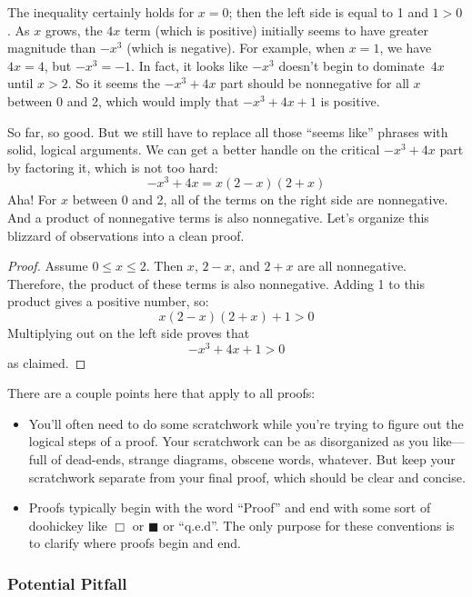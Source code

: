The inequality certainly holds for $x = 0$; then the left side is
equal to 1 and $1 > 0$.  As $x$ grows, the $4x$ term (which is
positive) initially seems to have greater magnitude than $-x^3$ (which
is negative).  For example, when $x = 1$, we have $4x = 4$, but $-x^3
= -1$.  In fact, it looks like $-x^3$ doesn't begin to dominate~$4x$
until $x > 2$.  So it seems the $-x^3 + 4x$ part should be nonnegative
for all $x$ between 0 and 2, which would imply that $-x^3 + 4x + 1$ is
positive.

So far, so good.  But we still have to replace all those ``seems
like'' phrases with solid, logical arguments.  We can get a better
handle on the critical $-x^3 + 4x$ part by factoring it, which is not
too hard:
%
\[
-x^3 + 4x = x (2 - x)(2 + x)
\]
%
Aha!  For $x$ between 0 and 2, all of the terms on the right side are
nonnegative.  And a product of nonnegative terms is also nonnegative.
Let's organize this blizzard of observations into a clean proof.

\begin{proof}
Assume $0 \leq x \leq 2$.  Then $x$, $2 - x$, and $2 + x$ are all
nonnegative.  Therefore, the product of these terms is also
nonnegative.  Adding 1 to this product gives a positive number, so:
%
\[
x (2 - x)(2 + x) + 1 > 0
\]
%
Multiplying out on the left side proves that
%
\[
-x^3 + 4x + 1 > 0
\]
%
as claimed.
\end{proof}


There are a couple points here that apply to all proofs:
%
\begin{itemize}

\item You'll often need to do some scratchwork while you're trying to
figure out the logical steps of a proof.  Your scratchwork can be as
disorganized as you like---full of dead-ends, strange diagrams,
obscene words, whatever.  But keep your scratchwork separate from your
final proof, which should be clear and concise.

\item Proofs typically begin with the word ``Proof'' and end with some
  sort of doohickey like $\Box$ or $\blacksquare$ or ``q.e.d''.  The
  only purpose for these conventions is to clarify where proofs begin
  and end.

\end{itemize}

\subsubsection{Potential Pitfall}

